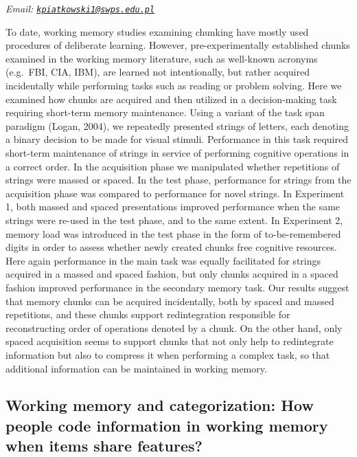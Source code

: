 \documentclass[
  12pt,
]{book}
\begin{document}
\emph{Email: \href{mailto:kpiatkowski1@swps.edu.pl}{\nolinkurl{kpiatkowski1@swps.edu.pl}}}

To date, working memory studies examining chunking have mostly used procedures of deliberate learning. However, pre-experimentally established chunks examined in the working memory literature, such as well-known acronyms (e.g.~FBI, CIA, IBM), are learned not intentionally, but rather acquired incidentally while performing tasks such as reading or problem solving. Here we examined how chunks are acquired and then utilized in a decision-making task requiring short-term memory maintenance. Using a variant of the task span paradigm (Logan, 2004), we repeatedly presented strings of letters, each denoting a binary decision to be made for visual stimuli. Performance in this task required short-term maintenance of strings in service of performing cognitive operations in a correct order. In the acquisition phase we manipulated whether repetitions of strings were massed or spaced. In the test phase, performance for strings from the acquisition phase was compared to performance for novel strings. In Experiment 1, both massed and spaced presentations improved performance when the same strings were re-used in the test phase, and to the same extent. In Experiment 2, memory load was introduced in the test phase in the form of to-be-remembered digits in order to assess whether newly created chunks free cognitive resources. Here again performance in the main task was equally facilitated for strings acquired in a massed and spaced fashion, but only chunks acquired in a spaced fashion improved performance in the secondary memory task.
Our results suggest that memory chunks can be acquired incidentally, both by spaced and massed repetitions, and these chunks support redintegration responsible for reconstructing order of operations denoted by a chunk. On the other hand, only spaced acquisition seems to support chunks that not only help to redintegrate information but also to compress it when performing a complex task, so that additional information can be maintained in working memory.

\hypertarget{working-memory-and-categorization-how-people-code-information-in-working-memory-when-items-share-features}{%
\subsection{Working memory and categorization: How people code information in working memory when items share features?}\label{working-memory-and-categorization-how-people-code-information-in-working-memory-when-items-share-features}}
\end{document}
